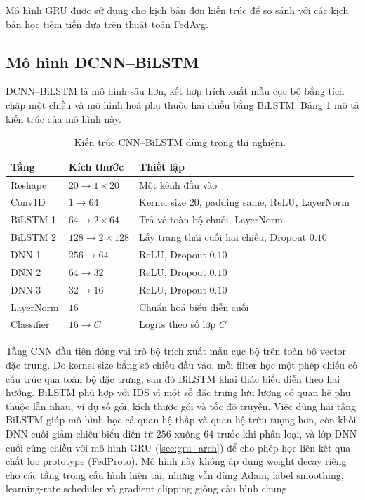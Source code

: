Mô hình GRU được sử dụng cho kịch bản đơn kiến trúc để so sánh với các kịch bản học tiệm tiến dựa trên thuật toán FedAvg.

\subsection{Mô hình DCNN--BiLSTM}
\label{sec:dcblstm_arch}
DCNN--BiLSTM \cite{hnamte2023dcnnbilstm} là mô hình sâu hơn, kết hợp trích xuất mẫu cục bộ bằng tích chập một chiều và mô hình hoá phụ thuộc hai chiều bằng BiLSTM. Bảng \ref{tab:dcblstm_arch} mô tả kiến trúc của mô hình này.

\begin{table}[H]
\centering
\caption{Kiến trúc CNN--BiLSTM dùng trong thí nghiệm.}
\label{tab:dcblstm_arch}
\begin{tabular}{lll}
\hline
Tầng & Kích thước & Thiết lập \\
\hline
Reshape & $20\rightarrow1\times20$ & Một kênh đầu vào \\
Conv1D & $1\rightarrow64$ & Kernel size $20$, padding same, ReLU, LayerNorm \\
BiLSTM 1 & $64\rightarrow2\times64$ & Trả về toàn bộ chuỗi, LayerNorm \\
BiLSTM 2 & $128\rightarrow2\times128$ & Lấy trạng thái cuối hai chiều, Dropout $0.10$ \\
DNN 1 & $256\rightarrow64$ & ReLU, Dropout $0.10$ \\
DNN 2 & $64\rightarrow32$ & ReLU, Dropout $0.10$ \\
DNN 3 & $32\rightarrow16$ & ReLU, Dropout $0.10$ \\
LayerNorm & $16$ & Chuẩn hoá biểu diễn cuối \\
Classifier & $16\rightarrow C$ & Logits theo số lớp $C$ \\
\hline
\end{tabular}
\end{table}

Tầng CNN đầu tiên đóng vai trò bộ trích xuất mẫu cục bộ trên toàn bộ vector đặc trưng. Do kernel size bằng số chiều đầu vào, mỗi filter học một phép chiếu có cấu trúc qua toàn bộ đặc trưng, sau đó BiLSTM khai thác biểu diễn theo hai hướng. BiLSTM phù hợp với IDS vì một số đặc trưng lưu lượng có quan hệ phụ thuộc lẫn nhau, ví dụ số gói, kích thước gói và tốc độ truyền. Việc dùng hai tầng BiLSTM giúp mô hình học cả quan hệ thấp và quan hệ trừu tượng hơn, còn khối DNN cuối giảm chiều biểu diễn từ $256$ xuống $64$ trước khi phân loại, và lớp DNN cuối cùng chiều với mô hình GRU (\ref{sec:gru_arch}) để cho phép học liên kết qua chắt lọc prototype (FedProto). Mô hình này không áp dụng weight decay riêng cho các tầng trong cấu hình hiện tại, nhưng vẫn dùng Adam, label smoothing, learning-rate scheduler và gradient clipping giống cấu hình chung.

